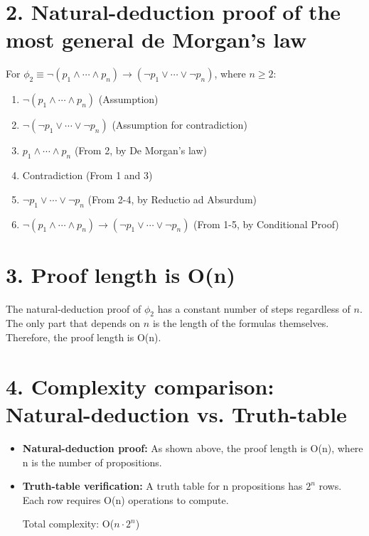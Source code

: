 \documentclass{article}
\newenvironment{proof}
{\begin{mdframed}[linewidth=0.5pt]\begin{enumerate}[label=\arabic*.,leftmargin=*]}
{\end{enumerate}\end{mdframed}}
\begin{document}
\section*{2. Natural-deduction proof of the most general de Morgan's law}

For $\phi_2 \equiv \neg(p_1 \land \cdots \land p_n) \to (\neg p_1 \lor \cdots \lor \neg p_n)$, where $n \geq 2$:

\begin{proof}
\begin{enumerate}
    \item $\neg(p_1 \land \cdots \land p_n)$ \hfill (Assumption)
    \item $\neg(\neg p_1 \lor \cdots \lor \neg p_n)$ \hfill (Assumption for contradiction)
    \item $p_1 \land \cdots \land p_n$ \hfill (From 2, by De Morgan's law)
    \item Contradiction \hfill (From 1 and 3)
    \item $\neg p_1 \lor \cdots \lor \neg p_n$ \hfill (From 2-4, by Reductio ad Absurdum)
    \item $\neg(p_1 \land \cdots \land p_n) \to (\neg p_1 \lor \cdots \lor \neg p_n)$ \hfill (From 1-5, by Conditional Proof)
\end{enumerate}
\end{proof}

\section*{3. Proof length is O(n)}

The natural-deduction proof of $\phi_2$ has a constant number of steps regardless of $n$. The only part that depends on $n$ is the length of the formulas themselves. Therefore, the proof length is O(n).

\section*{4. Complexity comparison: Natural-deduction vs. Truth-table}

\begin{itemize}
    \item \textbf{Natural-deduction proof:} As shown above, the proof length is O(n), where n is the number of propositions.
    
    \item \textbf{Truth-table verification:} A truth table for n propositions has $2^n$ rows. Each row requires O(n) operations to compute.
    
    Total complexity: O($n \cdot 2^n$)
\end{itemize}
\end{document}
